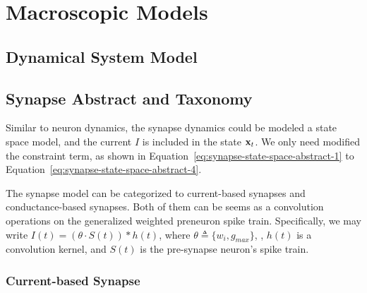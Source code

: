 
\chapter{Macroscopic Models}
\section{Dynamical System Model}

\section{Synapse Abstract and Taxonomy}
Similar to neuron dynamics, the synapse dynamics could be modeled a state space model,
and the current $I$ is included in the state $\bold x_t$. We only need modified the 
constraint term, as shown in Equation~\ref{eq:synapse-state-space-abstract-1} to 
Equation~\ref{eq:synapse-state-space-abstract-4}. 


The synapse model can be categorized to current-based synapses and 
conductance-based synapses. Both of them can be seems as a 
convolution operations on the generalized weighted preneuron spike train.
Specifically, we may write $I(t)=(\theta\cdot S(t)) * h(t)$, where $\theta\triangleq \{w_i, g_{max}\}$, 
, $h(t)$ is a convolution kernel, and $S(t)$ is the pre-synapse neuron's spike train.


\subsection{Current-based Synapse}


